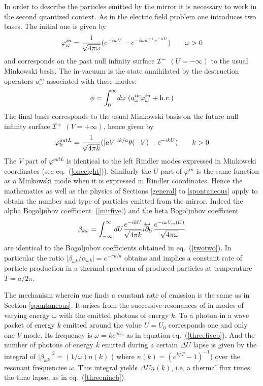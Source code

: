 \documentclass[12pt,oneside]{report}
\def\lrpartial{{\partial\kern-.75em\raise1.75ex
\hbox{$\leftrightarrow$}}\!\!}
\def\om{\omega	}
\begin{document}
In order to describe the particles emitted by the mirror it
is necessary to work in the second quantized context. As in
the electric field problem one introduces two bases. The
initial one is given by
\begin{equation}
\varphi^{in}_\omega = {1 \over \sqrt{4 \pi \omega}}(e^{-i
\omega V} - e^{
-i \omega a^{-1} e^{-aU}})\qquad \omega > 0
\label{mireight}
\end{equation}
and corresponds on the past null infinity surface  ${\cal I^-}$ $(U=-\infty)$
 to the usual Minkowski basis. The in-vacuum is the state annihilated by the
destruction operators $a_\omega^{in}$ associated with these modes:
\begin{equation}
\phi= \int_0^\infty \!d \omega\ ( a^{in}_\omega
\varphi^{in}_\omega + {\rm h.c.} ) \label{mirnine}
\end{equation}
The final basis corresponds  to the usual
Minkowski basis on the future null infinity surface ${\cal I^+}$ $(V=+\infty)$,
hence given by \begin{equation} \varphi_{k}^{out L} = {1 \over \sqrt{4 \pi
k}}(\vert aV \vert^{i k /a}\theta(-V) - e^{-i kU} )\qquad k > 0 \label{mirten}
\end{equation}
 The $V$ part of
$\varphi^{out L}$ is identical to the left 
Rindler modes expressed in Minkowski
coordinates (see eq.~(\ref{oneeight})). Similarly the $U$ part of
$\varphi^{in}$ is the same function as a Minkowski mode when it is expressed in
Rindler coordinates. Hence the mathematics as well as the physics of Sections
\ref{general} to \ref{spontaneous} apply to obtain the number and type of
particles emitted from the mirror. Indeed the alpha Bogoljubov
coefficient~(\ref{mirfive}) and the beta Bogoljubov coefficient 
\begin{equation}
\beta_{k \omega  } = 
\int^{\infty}_{-\infty} dU { e ^{-i k U}\over \sqrt{4 \pi k}} i {\lrpartial}_U
{e^{- i \omega V_m(U)} \over\sqrt{4 \pi \omega}}
\label{mirfiveB}
\end{equation}
are identical to the Bogoljubov coefficients obtained in eq.~(\ref{twotwo}).
In particular the ratio $\vert \beta_{\om k}/ \alpha_{\om k}
\vert = e^{-  \pi k / a}$
obtains and implies a constant rate of particle production in a thermal spectrum
of produced particles at temperature $T = a/ 2
\pi$. 

The mechanism wherein one finds a constant rate of
emission  is the same as in Section \ref{spontaneous}.
It arises from the successive  resonances of in-modes 
of varying energy $\omega$ with the emitted
photons of energy $k$.  To a photon in a wave packet of energy
$k$ emitted around the value $U=U_0$ corresponds
one and only one $V$-mode. Its frequency is $\omega = {k}e^{a
U_0}$ as in equation eq.~(\ref{threefiveb}). 
And the number of photons of energy $k$ emitted during a certain
$\Delta U$ lapse is given by the integral
of 
$ \vert \beta_{\om k} \vert^2 = (1 / \omega) n(k)$
(  where  $ n(k)=(e^{k/T} -1)^{-1}$)
over the resonant frequencies $\om$.
This integral yields $\Delta U  n(k)$, i.e. a thermal flux times 
the time lapse, as in eq.~(\ref{threenineb}).
\end{document}
